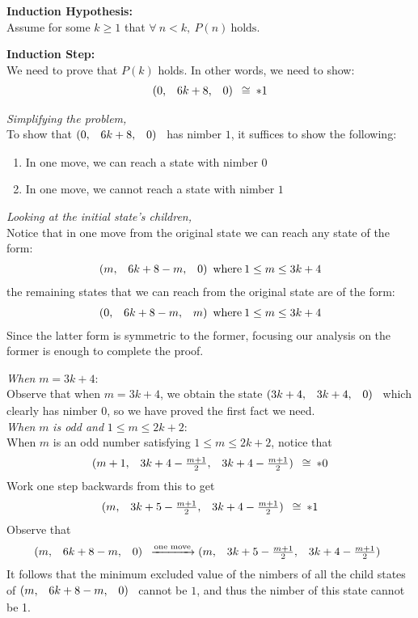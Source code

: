 \documentclass{article}
\makeatletter
\newcommand{\game}[3]{\begin{array}{@{}*6r}(#1, & #2, & #3)\end{array}}
\newcommand{\gcong}{\cong\:}
\makeatother
\begin{document}
\bigskip
\textbf{Induction Hypothesis:} \\
Assume for some $k \geq 1$ that 
$\forall \: n < k, \: P(n) \: \text{holds}$.

\bigskip
\textbf{Induction Step:} \\
We need to prove that $P(k)$ holds. In other words, we need to show:
\begin{equation*}
  \game{0}{6k + 8}{0} \gcong *1
\end{equation*}

\bigskip
\textit{Simplifying the problem,}\\
To show that $\game{0}{6k+8}{0}$ has nimber $1$, it suffices to show
the following:
\begin{enumerate}
  \item In one move, we can reach a state with nimber $0$
  \item In one move, we cannot reach a state with nimber $1$
\end{enumerate}

\bigskip
\textit{Looking at the initial state's children,}\\
Notice that in one move from the original state we can reach any state
of the form:
\begin{equation*}
  \game{m}{6k+8-m}{0} \text{where} \: 1 \leq m \leq 3k + 4 
  \end{equation*}
the remaining states that we can reach from the original state are of
the form:
\begin{equation*}
  \game{0}{6k+8-m}{m} \text{where} \: 1 \leq m \leq 3k + 4
\end{equation*}
Since the latter form is symmetric to the former, focusing our analysis
on the former is enough to complete the proof.

\bigskip
\textit{When} $m = 3k + 4$:\\
Observe that when $m = 3k + 4$, we obtain the state
$\game{3k+4}{3k+4}{0}$ which clearly has nimber $0$,
so we have proved the first fact we need. \\

\bigskip
\textit{When} $m$ \textit{is odd and} $1 \leq m \leq 2k + 2$:\\
When $m$ is an odd number satisfying $1 \leq m \leq 2k + 2$,
notice that
\begin{equation*}
  \game{m+1}{3k+4-\frac{m+1}{2}}{3k+4-\frac{m+1}{2}} \gcong *0
\end{equation*}
Work one step backwards from this to get
\begin{equation*}
  \game{m}{3k+5-\frac{m+1}{2}}{3k+4-\frac{m+1}{2}} \gcong *1
\end{equation*}
Observe that
\begin{equation*}
  \game{m}{6k+8-m}{0} \xrightarrow{\text{one move}}
  \game{m}{3k+5-\frac{m+1}{2}}{3k+4-\frac{m+1}{2}}
\end{equation*}
It follows that the minimum excluded value of the nimbers of
all the child states of $\game{m}{6k+8-m}{0}$ cannot be $1$, and
thus the nimber of this state cannot be 1.
\end{document}
